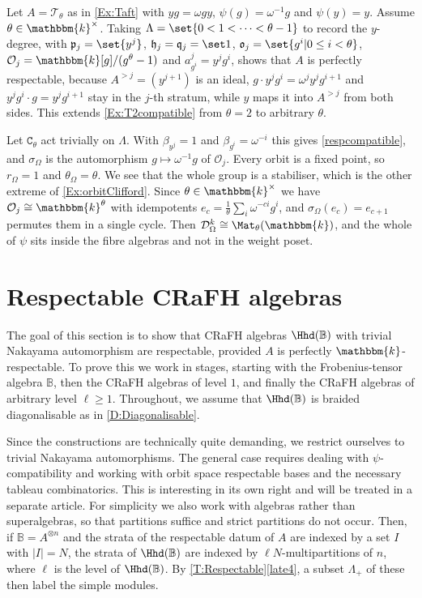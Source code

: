 \documentclass[a4paper,11pt]{amsart}
\numberwithin{equation}{subsection}
\theoremstyle{definition}
\theoremstyle{theorem}
\theoremstyle{remark}
\newcommand\CO{\mathcal{O}}
\newcommand\plam[1][\lambda]{\mathfrak{p}_{#1}}
\newcommand\hlam[1][\lambda]{\mathfrak{h}_{#1}}
\newcommand\qlam[1][\lambda]{\mathfrak{q}_{#1}}
\newcommand\Olam[1][\lambda]{\CO_{#1}}
\newcommand\olam[1][\lambda]{\mathfrak{o}_{#1}}
\newcommand\Taft[1][\theta]{\mathscr{T}_{#1}}
\newcommand\kk{\mathbbm{k}}
\newcommand{\Bo}{\mathbb{B}}
\begin{document}
\begin{Example}\label{Ex:orbitTaft}
Let $A=\Taft$ as in \autoref{Ex:Taft} with $yg=\omega gy$,
$\psi(g)=\omega^{-1}g$ and $\psi(y)=y$. Assume $\theta\in\kk^{\times}$. Taking
$\Lambda=\set{0<1<\dots<\theta-1}$ to record the $y$-degree, with
$\plam[j]=\set{y^{j}}$, $\hlam[j]=\qlam[j]=\set1$,
$\olam[j]=\set{g^{i}|0\le i<\theta}$, $\Olam[j]=\kk[g]/(g^{\theta}-1)$ and
$a^{j}_{g^{i}}=y^{j}g^{i}$, shows that $A$ is perfectly respectable, because
$A^{>j}=(y^{j+1})$ is an ideal, $g\cdot y^{j}g^{i}=\omega^{j}y^{j}g^{i+1}$ and
$y^{j}g^{i}\cdot g=y^{j}g^{i+1}$ stay in the $j$-th stratum, while $y$ maps it
into $A^{>j}$ from both sides. This extends \autoref{Ex:T2compatible} from
$\theta=2$ to arbitrary $\theta$.

Let $\mathtt{C}_\theta$ act trivially on $\Lambda$. With $\beta_{y^{j}}=1$ and
$\beta_{g^{i}}=\omega^{-i}$ this gives \autoref{respcompatible}, and
$\sigma_\Omega$ is the automorphism $g\mapsto\omega^{-1}g$ of $\Olam[j]$. Every
orbit is a fixed point, so $r_\Omega=1$ and $\theta_\Omega=\theta$. We see that the whole
group is a stabiliser, which is  the other extreme of \autoref{Ex:orbitClifford}. Since $\theta\in\kk^{\times}$ we have $\Olam[j]\cong\kk^{\theta}$ with
idempotents $e_c=\tfrac1\theta\sum_{i}\omega^{-ci}g^{i}$, and
$\sigma_\Omega(e_c)=e_{c+1}$ permutes them in a single cycle. Then
$\mathcal{D}^{k}_\Omega\cong\Mat_\theta(\kk)$, and the whole of $\psi$ sits inside the
fibre algebras and not in the weight poset.
\end{Example}


\section{Respectable CRaFH algebras}
The goal of this section is to show that CRaFH algebras $\Hhd(\Bo)$ with trivial Nakayama automorphism are respectable, provided $A$ is perfectly $\kk$-respectable. To prove this we work in stages, starting with the Frobenius-tensor algebra $\Bo$, then the CRaFH algebras of level $1$, and finally the CRaFH algebras of arbitrary level $\ell\ge1$. Throughout, we assume that $\Hhd(\Bo)$ is braided diagonalisable as in  \autoref{D:Diagonalisable}.

Since the constructions are technically quite demanding, we restrict
ourselves to trivial Nakayama automorphisms. The general case requires
dealing with $\psi$-compatibility and working with orbit space
respectable bases and the necessary tableau combinatorics. This  is
interesting in its own right and will be treated in a separate article.
For simplicity we also work with algebras rather than superalgebras, so
that partitions suffice and strict partitions do not occur. Then, if
$\Bo=A^{\otimes n}$ and the strata of the respectable datum of $A$ are
indexed by a set $I$ with $|I|=N$, the strata of $\Hhd(\Bo)$ are indexed
by $\ell N$-multipartitions of $n$, where $\ell$ is the level of
$\Hhd(\Bo)$. By \autoref{T:Respectable}\autoref{late4}, a subset $\Lambda_+$ of these then label the simple modules.
\end{document}
